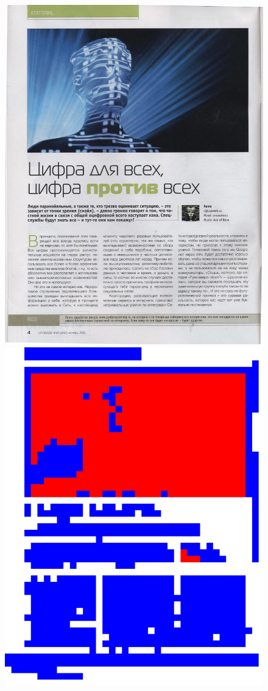 \documentclass{book}
\begin{document}
\begin{figure}[H]
\begin{center}
\includegraphics[scale=0.25]{images/rect_1.jpg}
\includegraphics[scale=0.06]{images/rect_1_res_hog_hsv_kmeans.jpg}

\end{center}
\end{figure}
\end{document}

